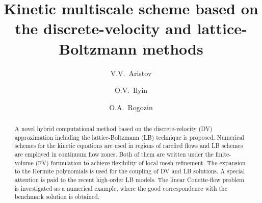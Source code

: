 \documentclass[]{elsarticle} %
\begin{document}
\begin{frontmatter}

\title{Kinetic multiscale scheme based on the discrete-velocity and lattice-Boltzmann methods}

\author[ccas]{V.V.~Aristov}

\author[ccas]{O.V.~Ilyin}

\author[skoltech,ccas]{O.A.~Rogozin}


\address[ccas]{Dorodnicyn Computing Center,
    Federal Research Center "Computer Science and Control" of Russian Academy of Science, Moscow, Russia}
\address[skoltech]{Center for Design, Manufacturing, and Materials,
    Skolkovo Institute of Science and Technology, Skolkovo, Russia}

\begin{abstract}

A novel hybrid computational method based on the discrete-velocity (DV) approximation including the lattice-Boltzmann (LB) technique is proposed.
Numerical schemes for the kinetic equations are used in regions of rarefied flows and LB schemes are employed in continuum flow zones.
Both of them are written under the finite-volume (FV) formulation to achieve flexibility of local mesh refinement.
The expansion to the Hermite polynomials is used for the coupling of DV and LB solutions.
A special attention is paid to the recent high-order LB models.
The linear Couette-flow problem is investigated as a numerical example,
where the good correspondence with the benchmark solution is obtained.






\end{abstract}
\end{frontmatter}
\end{document}
